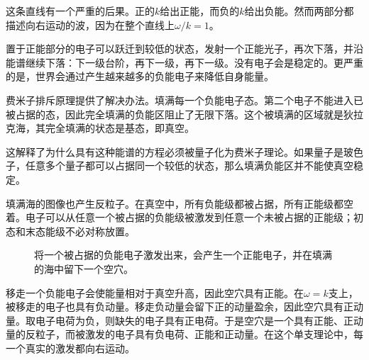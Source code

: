 这条直线有一个严重的后果。正的\(k\)给出正能，而负的\(k\)给出负能。然而两部分都描述向右运动的波，因为在整个直线上\(\omega/k=1\)。

置于正能部分的电子可以跃迁到较低的状态，发射一个正能光子，再次下落，并沿能谱继续下落：下一级台阶，再下一级，再下一级。没有电子会是稳定的。更严重的是，世界会通过产生越来越多的负能电子来降低自身能量。

费米子排斥原理提供了解决办法。填满每一个负能电子态。第二个电子不能进入已被占据的态，因此完全填满的负能区阻止了无限下落。这个被填满的区域就是狄拉克海，其完全填满的状态是基态，即真空。

\begin{classroomqa}
\end{classroomqa}

这解释了为什么具有这种能谱的方程必须被量子化为费米子理论。如果量子是玻色子，任意多个量子都可以占据同一个较低的状态，那么填满负能区并不能使真空稳定。

填满海的图像也产生反粒子。在真空中，所有负能级都被占据，所有正能级都空着。电子可以从任意一个被占据的负能级被激发到任意一个未被占据的正能级；初态和末态能级不必对称放置。

\begin{figure}[htbp]
\centering
{}
\caption{将一个被占据的负能电子激发出来，会产生一个正能电子，并在填满的海中留下一个空穴。}
\end{figure}

移走一个负能电子会使能量相对于真空升高，因此空穴具有正能。在\(\omega=k\)支上，被移走的电子也具有负动量。移走负动量会留下正的动量盈余，因此空穴具有正动量。取电子电荷为负，则缺失的电子具有正电荷。于是空穴是一个具有正能、正动量的反粒子，而被激发的电子具有负电荷、正能和正动量。在这个单支理论中，每一个真实的激发都向右运动。

